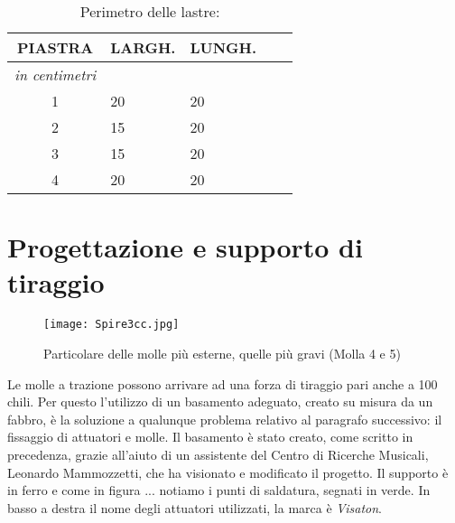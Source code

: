 \begin{table}[htp]
\caption{Perimetro delle lastre:}
\begin{center}

\begin{tabular}{cp{2cm}p{2cm}p{.2cm}p{2cm}} \textbf{PIASTRA}&\textbf{LARGH.}&\textbf{LUNGH.}\\
\hline \textit{in centimetri} \\
\hline 1&20&20\\
\hline 2&15&20\\
\hline 3&15&20\\
\hline 4&20&20\\
\end{tabular}

\end{center}
\label{tab:lastre}
\end{table}%


\section{Progettazione e supporto di tiraggio}


\begin{figure}[htbp]
\begin{center}
\texttt{[image: Spire3cc.jpg]}
\caption{Particolare delle molle più esterne, quelle più gravi (Molla 4 e 5)}
\label{fig:partmolle}
\end{center}
\end{figure}

Le molle a trazione possono arrivare ad una forza di tiraggio pari anche a 100 chili. Per questo l'utilizzo di un basamento adeguato, creato su misura da un fabbro, è la soluzione a qualunque problema relativo al paragrafo successivo: il fissaggio di attuatori e molle.
Il basamento è stato creato, come scritto in precedenza, grazie all'aiuto di un assistente del Centro di Ricerche Musicali, Leonardo Mammozzetti, che ha visionato e modificato il progetto. Il supporto è in ferro e come in figura ... notiamo i punti di saldatura, segnati in verde. In basso a destra il nome degli attuatori utilizzati, la marca è \emph{Visaton}.

